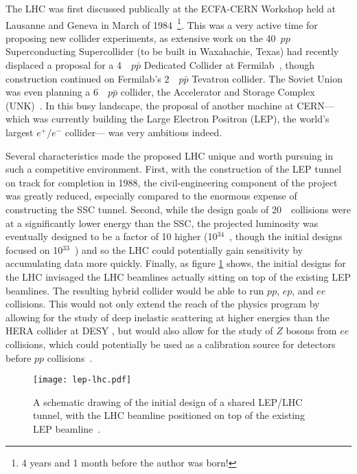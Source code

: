 The LHC was first discussed publically at the ECFA-CERN Workshop held at Lausanne and Geneva in March of 1984~\cite{ECFA1984}\footnote{4 years and 1 month before the author was born!}. This was a very active time for proposing new collider experiments, as extensive work on the 40~\TeV $pp$ Superconducting Supercollider (to be built in Waxahachie, Texas) had recently displaced a proposal for a 4~\TeV~$p\bar{p}$ Dedicated Collider at Fermilab~\cite{ECFA1984,DC}, though construction continued on Fermilab's 2~\TeV~$p\bar{p}$ Tevatron collider. The Soviet Union was even planning a 6~\TeV~$p\bar{p}$ collider, the Accelerator and Storage Complex (UNK)~\cite{UNK}. In this busy landscape, the proposal of another machine at CERN--- which was currently building the Large Electron Positron (LEP), the world's largest $e^+/e^-$ collider--- was very ambitious indeed.

Several characteristics made the proposed LHC unique and worth pursuing in such a competitive environment. First, with the construction of the LEP tunnel on track for completion in 1988, the civil-engineering component of the project was greatly reduced, especially compared to the enormous expense of constructing the SSC tunnel. Second, while the design goals of 20~\TeV~collisions were at a significantly lower energy than the SSC, the projected luminosity was eventually designed to be a factor of 10 higher (10$^{34}$~\lumirate, though the initial designs focused on 10$^{33}$~\lumirate) and so the LHC could potentially gain sensitivity by accumulating data more quickly. Finally, as figure \ref{fig:lhc:lep-lhc} shows, the initial designs for the LHC invisaged the LHC beamlines actually sitting on top of the existing LEP beamlines. The resulting hybrid collider would be able to run $pp$, $ep$, and $ee$ collisions. This would not only extend the reach of the physics program by allowing for the study of deep inelastic scattering at higher energies than the HERA collider at DESY , but would also allow for the study of $Z$ bosons from $ee$ collisions, which could potentially be used as a calibration source for detectors before $pp$ collisions~\cite{ECFA1984}.


\begin{figure}
\centering
\texttt{[image: lep-lhc.pdf]}
\label{fig:lhc:lep-lhc}
\caption{A schematic drawing of the initial design of a shared LEP/LHC tunnel, with the LHC beamline positioned on top of the existing LEP beamline~\cite{ECFA1984}.}
\end{figure}

